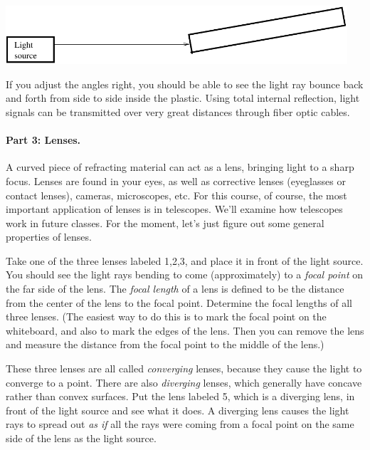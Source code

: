 \centerline{\includegraphics[width=5in]{lenses1/lensfig4.pdf}}



If you adjust the angles right, you should be able to see the light ray
bounce back and forth from side to side inside the plastic.  
Using total internal reflection, 
light signals can be transmitted over very great distances through
fiber optic cables.

\paragraph{Part 3: Lenses.}
A curved piece of refracting material can act as a lens, bringing
light to a sharp focus.  Lenses are found in your eyes, as well as
corrective lenses (eyeglasses or contact lenses), cameras,
microscopes, etc.  For this course, of course, the most important
application of lenses is in telescopes.  We'll examine how telescopes
work in future classes.  For the moment, let's just figure
out some general properties of lenses.

Take one of the three lenses labeled 1,2,3, and place it in front
of the light source.  You should see the light rays bending to
come (approximately) to a {\it focal point} on the far side of the lens.  
The {\it focal length} of a lens is defined to be the distance from the center
of the lens to the focal point.  Determine the focal lengths of all
three lenses.  (The easiest way to do this is to mark the focal point
on the whiteboard, and also to mark the edges of the lens.  Then
you can remove the lens and measure the distance from the focal
point to the middle of the lens.)

\answerspace{2.5in}

These three lenses are all called {\it converging} lenses, because
they cause the light to converge to a point.  There are also {\it diverging}
lenses, which generally have concave rather than convex surfaces.  Put
the lens labeled 5, which is a diverging lens, 
in front of the light source and see what it does.
A diverging lens causes the light rays to spread out {\it as if} all the
rays were coming from a focal point on the same side of the lens
as the light source.

